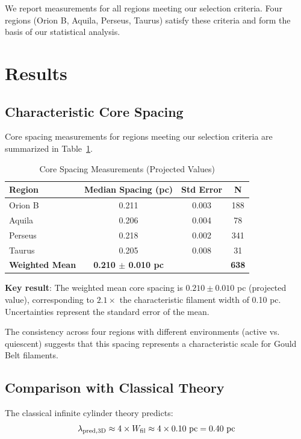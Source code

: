 \documentclass[11pt,a4paper]{article}
\begin{document}
We report measurements for all regions meeting our selection criteria. Four regions (Orion B, Aquila, Perseus, Taurus) satisfy these criteria and form the basis of our statistical analysis.

\section{Results}

\subsection{Characteristic Core Spacing}

Core spacing measurements for regions meeting our selection criteria are summarized in Table~\ref{tab:spacing}.

\begin{table}[H]
\centering
\caption{Core Spacing Measurements (Projected Values)}
\label{tab:spacing}
\begin{tabular}{lccc}
\toprule
Region & Median Spacing (pc) & Std Error & N \\
\midrule
Orion B  & 0.211 & 0.003 & 188 \\
Aquila   & 0.206 & 0.004 & 78 \\
Perseus  & 0.218 & 0.002 & 341 \\
Taurus   & 0.205 & 0.008 & 31 \\
\midrule
\textbf{Weighted Mean} & \textbf{0.210 $\pm$ 0.010 pc} &  & \textbf{638} \\
\bottomrule
\end{tabular}
\end{table}

\noindent\textbf{Key result}: The weighted mean core spacing is $0.210 \pm 0.010$ pc (projected value), corresponding to $2.1 \times$ the characteristic filament width of 0.10 pc. Uncertainties represent the standard error of the mean.

The consistency across four regions with different environments (active vs. quiescent) suggests that this spacing represents a characteristic scale for Gould Belt filaments.

\subsection{Comparison with Classical Theory}

The classical infinite cylinder theory predicts:
\begin{equation}
\lambda_{\rm pred,3D} \approx 4 \times W_{\rm fil} \approx 4 \times 0.10~{\rm pc} = 0.40~{\rm pc}
\end{equation}
\end{document}
